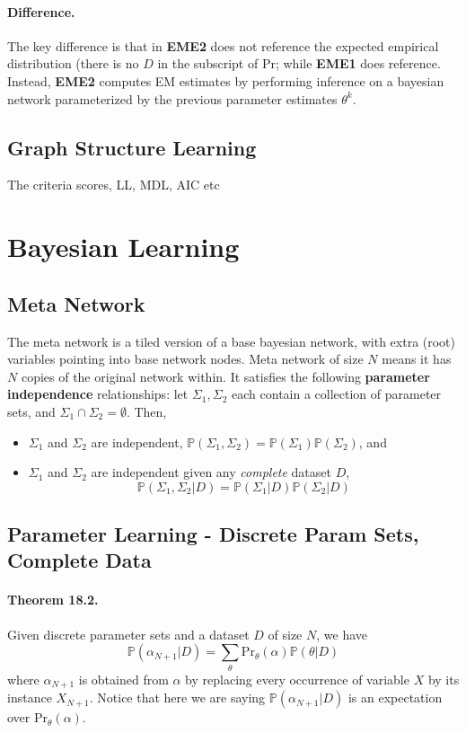 \documentclass[11pt]{article}
\newcommand{\pr}{\mathrm{Pr}}
\begin{document}
\paragraph{Difference.} The key difference is that in \textbf{EME2} does not reference the expected empirical distribution (there is no $D$ in the subscript of $\pr$; while \textbf{EME1} does reference. Instead, \textbf{EME2} computes EM estimates by performing inference on a bayesian network parameterized by the previous parameter estimates $\theta^k$.  

\subsection{Graph Structure Learning}
The criteria scores, LL, MDL, AIC etc

\section{Bayesian Learning}
\subsection{Meta Network}
The meta network is a tiled version of a base bayesian network, with extra (root) variables pointing into base network nodes. Meta network of size $N$ means it has $N$ copies of the original network within. It satisfies the following \textbf{parameter independence} relationships: let $\Sigma_1, \Sigma_2$ each contain a collection of parameter sets, and $\Sigma_1 \cap \Sigma_2 = \emptyset$. Then, 
\begin{itemize}
	\item $\Sigma_1$ and $\Sigma_2$ are independent, $\mathbb P (\Sigma_1, \Sigma_2) = \mathbb P (\Sigma_1 ) \mathbb P (\Sigma_2) $, and
	\item $\Sigma_1$ and $\Sigma_2$ are independent given any \textit{complete} dataset $D$, 
	\begin{equation}
		\mathbb P (\Sigma_1, \Sigma_2 | D) = \mathbb P (\Sigma_1 |D) \mathbb P (\Sigma_2 |D) 
	\end{equation}
\end{itemize}

\subsection{Parameter Learning - Discrete Param Sets, Complete Data}
\paragraph{Theorem 18.2.} Given discrete parameter sets and a dataset $D$ of size $N$, we have
\begin{equation}
	\mathbb P (\alpha _{N + 1} | D) = \sum_\theta \pr_\theta (\alpha) \mathbb P (\theta | D)
\end{equation}
where $\alpha_{N + 1}$ is obtained from $\alpha$ by replacing every occurrence of variable $X$ by its instance $X_{N+1}$. Notice that here we are saying $\mathbb P (\alpha _{N + 1} | D) $ is an expectation over $\pr_\theta (\alpha) $.
\end{document}
